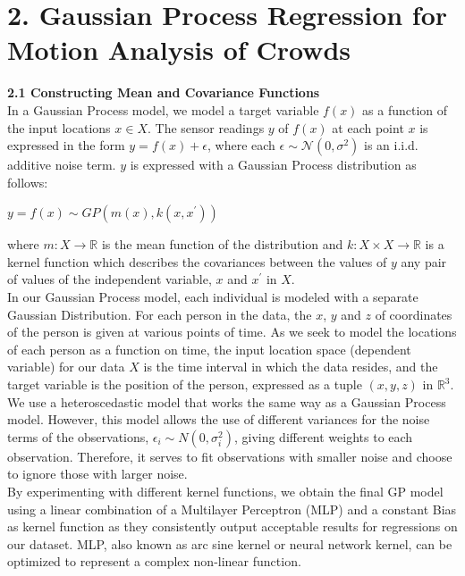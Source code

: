 \documentclass[letterpaper]{article}
\begin{document}
\section{2.  Gaussian Process Regression for Motion Analysis of Crowds}

{\bf2.1  Constructing Mean and Covariance Functions} \\

In a Gaussian Process model, we model a target variable $f(x)$ as a function of the input locations $x \in X$. The sensor readings $y$ of $f(x)$ at each point $x$ is expressed in the form $y = f(x) + \epsilon$, where each $\epsilon \sim \mathcal{N}(0, \sigma^2)$ is an i.i.d. additive noise term. $y$ is expressed with a Gaussian Process distribution as follows:

\begin{center}
$y = f(x) \sim GP(m(x), k(x,x^\prime))$
\end{center}

where $m: X \rightarrow \mathbb{R}$ is the mean function of the distribution and $k: X \times X \rightarrow \mathbb{R}$ is a kernel function which describes the covariances between the values of $y$ any pair of values of the independent variable, $x$ and $x^\prime$ in $X$. \\

In our Gaussian Process model, each individual is modeled with a separate Gaussian Distribution. For each person in the data, the $x$, $y$ and $z$ of coordinates of the person is given at various points of time. As we seek to model the locations of each person as a function on time, the input location space (dependent variable) for our data $X$ is the time interval in which the data resides, and the target variable is the position of the person, expressed as a tuple $(x,y,z)$ in $\mathbb{R}^3$. \\

We use a heteroscedastic model that works the same way as a Gaussian Process model. However, this model allows the use of different variances for the noise terms of the observations, $\epsilon_i \sim N(0, \sigma_i^2)$, giving different weights to each observation. Therefore, it serves to fit observations with smaller noise and choose to ignore those with larger noise. \\

By experimenting with different kernel functions, we obtain the final GP model using a linear combination of a Multilayer Perceptron (MLP) and a constant Bias as kernel function as they consistently output acceptable results for regressions on our dataset. MLP, also known as arc sine kernel or neural network kernel, can be optimized to represent a complex non-linear function. \\
\end{document}
